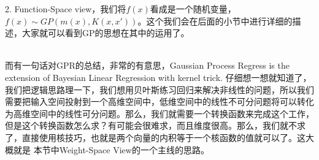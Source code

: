 \documentclass[a4paper]{article}
\begin{document}
2. Function-Space view，我们将$f(x)$看成是一个随机变量，$f(x)\sim GP(m(x),K(x,x'))$。这个我们会在后面的小节中进行详细的描述，大家就可以看到GP的思想在其中的运用了。

~\\

而有一句话对GPR的总结，非常的有意思，Gaussian Process Regress is the extension of Bayesian Linear Regression with kernel trick. 仔细想一想就知道了，我们把逻辑思路理一下，我们想用贝叶斯练习回归来解决非线性的问题，所以我们需要把输入空间投射到一个高维空间中，低维空间中的线性不可分问题将可以转化为高维空间中的线性可分问题。那么，我们就需要一个转换函数来完成这个工作，但是这个转换函数怎么求？有可能会很难求，而且维度很高。那么，我们就不求了，直接使用核技巧，也就是两个向量的内积等于一个核函数的值就可以了。这大概就是
本节中Weight-Space View的一个主线的思路。
\end{document}
